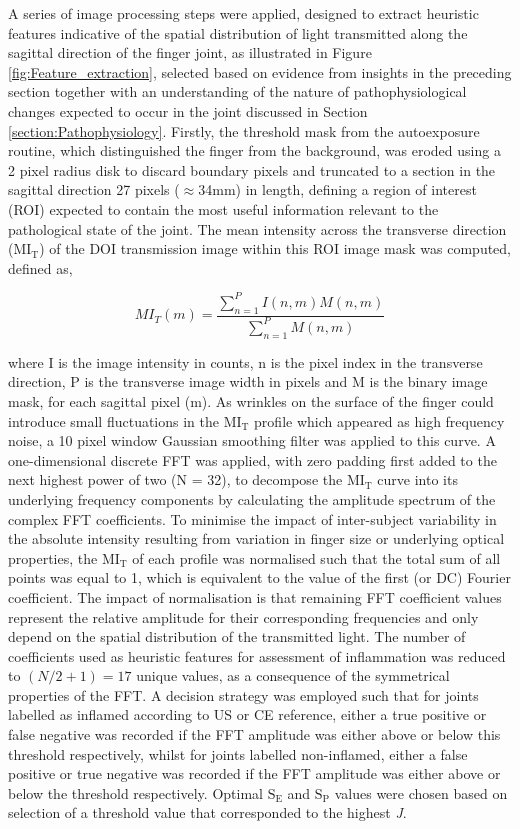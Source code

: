 \documentclass[twoside]{bhamthesis}
\theoremstyle{definition}
\begin{document}
A series of image processing steps were applied, designed to extract heuristic features indicative of the spatial distribution of light transmitted along the sagittal direction of the finger joint, as illustrated in Figure \ref{fig:Feature_extraction}, selected based on evidence from insights in the preceding section together with an understanding of the nature of pathophysiological changes expected to occur in the joint discussed in Section \ref{section:Pathophysiology}. Firstly, the threshold mask from the autoexposure routine, which distinguished the finger from the background, was eroded using a 2 pixel radius disk to discard boundary pixels and truncated to a section in the sagittal direction 27 pixels ($\approx$34mm) in length, defining a region of interest (ROI) expected to contain the most useful information relevant to the pathological state of the joint. The mean intensity across the transverse direction ($\mathrm{MI_T}$) of the DOI transmission image within this ROI image mask was computed, defined as,

\begin{equation}
	MI_T(m) = \frac{\sum^{P}_{n=1} I(n,m)M(n,m)}{\sum^{P}_{n=1} M(n,m)}
\end{equation}

where I is the image intensity in counts, n is the pixel index in the transverse direction, P is the transverse image width in pixels and M is the binary image mask, for each sagittal pixel (m). As wrinkles on the surface of the finger could introduce small fluctuations in the $\mathrm{MI_T}$ profile which appeared as high frequency noise, a 10 pixel window Gaussian smoothing filter was applied to this curve. A one-dimensional discrete FFT was applied, with zero padding first added to the next highest power of two (N = 32), to decompose the $\mathrm{MI_T}$ curve into its underlying frequency components by calculating the amplitude spectrum of the complex FFT coefficients. To minimise the impact of inter-subject variability in the absolute intensity resulting from variation in finger size or underlying optical properties, the $\mathrm{MI_T}$ of each profile was normalised such that the total sum of all points was equal to 1, which is equivalent to the value of the first (or DC) Fourier coefficient. The impact of normalisation is that remaining FFT coefficient values represent the relative amplitude for their corresponding frequencies and only depend on the spatial distribution of the transmitted light. The number of coefficients used as heuristic features for assessment of inflammation was reduced to $(N/2+1)=17$ unique values, as a consequence of the symmetrical properties of the FFT. A decision strategy was employed such that for joints labelled as inflamed according to US or CE reference, either a true positive or false negative was recorded if the FFT amplitude was either above or below this threshold respectively, whilst for joints labelled non-inflamed, either a false positive or true negative was recorded if the FFT amplitude was either above or below the threshold respectively. Optimal $\mathrm{S_E}$ and $\mathrm{S_P}$ values were chosen based on selection of a threshold value that corresponded to the highest \textit{J}.
\end{document}
